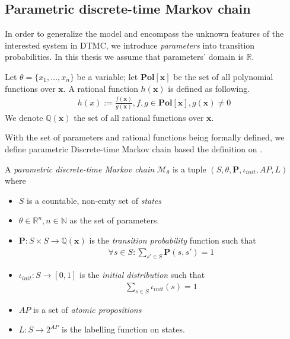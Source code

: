 \subsection{Parametric discrete-time Markov chain}
In order to generalize the model and encompass the unknown features of the interested system in
DTMC, we introduce \textit{parameters} into transition probabilities. In this thesis we assume that
parameters' domain is $\mathbb{R}$.
\begin{definition}
      \rm
      Let $\theta=\{x_1,\ldots,x_n\}$ be a variable; let $\mathbf{Pol}[\mathbf{x}]$ be the set of
      all polynomial functions over $\mathbf{x}$. A rational function $h(\mathbf{x})$ is defined
      as following.
      \begin{align*}
            h(x) := \frac{f(\mathbf{x})}{g(\mathbf{x})}, f,g\in\mathbf{Pol}[\mathbf{x}], g(\mathbf{x}) \neq 0
      \end{align*}
      We denote $\mathbb{Q}(\mathbf{x})$ the set of all rational functions over $\mathbf{x}$.
\end{definition}
With the set of parameters and rational functions being formally defined, we define parametric
Discrete-time Markov chain based the definition on \cite{junges2019parameter}.
\begin{definition}
      \rm
      A \textit{parametric discrete-time Markov chain} $\mathcal{M}_\theta$ is a tuple $(S, \theta,
            \mathbf{P}, \iota_{init}, AP, L)$ where
      \begin{itemize}
            \item $S$ is a countable, non-emty set of \textit{states}
            \item $\theta \in \mathbb{R}^n, n \in \mathbb{N}$ as the set of  parameters.
            \item $\mathbf{P}:S\times S \rightarrow \mathbb{Q}(\mathbf{x})$ is the \textit{transition
                        probability} function such that
                  \begin{align*}
                        \forall s \in S : \sum_{s'\in S}\mathbf{P}(s, s') = 1
                  \end{align*}
            \item $\iota_{init}: S \rightarrow [0,1]$ is the \textit{initial distribution} such that
                  \begin{align*}
                        \sum_{s\in S}\iota_{init}(s) = 1
                  \end{align*}
            \item $AP$ is a set of \textit{atomic propositions}
            \item $L: S \rightarrow 2^{AP}$ is the labelling function on states.
      \end{itemize}
\end{definition}
